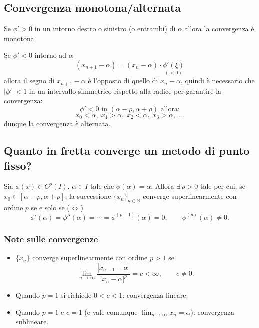 \documentclass[12pt,a4paper,]{report}
\begin{document}
\subsection{Convergenza monotona/alternata}
\begin{definizione}
    Se $\phi'>0$ in un intorno destro o sinistro (o entrambi) di $\alpha$ allora la convergenza è monotona.
\end{definizione}
\begin{definizione}
    Se $\phi'<0$ intorno ad $\alpha$
    \[
    (x_{n+1} - \alpha) = (x_n - \alpha)\cdot \underset{(<0)}{\phi'(\xi)}
    \]
    allora il segno di $x_{n+1} - \alpha$ è l'opposto di quello di $x_n - \alpha$, quindi è necessario che $|\phi'|<1$ in un intervallo simmetrico rispetto alla radice per garantire la convergenza:
    \[
    \phi'<0 \text{ in } (\alpha - \rho, \alpha + \rho) \text{ allora:}
    \]
    \[
    x_0 < \alpha, \; x_1 > \alpha, \; x_2 < \alpha, \; x_3 > \alpha, \;\dots
    \]
    dunque la convergenza è alternata.
\end{definizione}
\subsection{Quanto in fretta converge un metodo di punto fisso?}
\begin{teorema}
    Sia $\phi(x) \in C^{p}(I)$, $\alpha \in I$ tale che $\phi(\alpha) = \alpha$.
Allora $\exists \,\rho > 0$ tale per cui, se
$x_0 \in [\alpha - \rho, \alpha + \rho]$,
la successione $\{x_n\}_{n \in \mathbb{N}}$ converge
superlinearmente con ordine $p$ se e solo se ($\Leftrightarrow$)
\[
\phi'(\alpha) = \phi''(\alpha) = \cdots = \phi^{(p-1)}(\alpha) = 0,
\qquad
\phi^{(p)}(\alpha) \neq 0.
\]
\end{teorema}

\subsubsection{Note sulle convergenze}
\begin{itemize}
    \item
    $\{x_n\}$ converge superlinearmente con ordine $p > 1$ se
    \[
    \lim_{n \to \infty}
    \frac{|x_{n+1} - \alpha|}{|x_n - \alpha|^{p}}
    = c < \infty,
    \qquad c \neq 0.
    \]

    \item
    Quando $p = 1$ si richiede $0 < c < 1$:
    convergenza lineare.

    \item
    Quando $p = 1$ e $c = 1$ (e vale comunque $\lim_{n \to \infty} x_n = \alpha$):
    convergenza sublineare.
\end{itemize}
\end{document}
